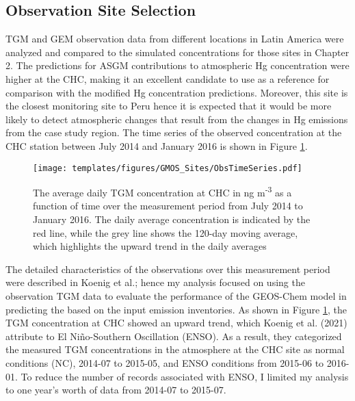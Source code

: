 
\subsection{Observation Site Selection}\label{c3_site_selection}

\begin{flushleft}
TGM and GEM observation data from different locations in Latin America were analyzed and compared to the \gc simulated \hg concentrations for those sites in Chapter 2. The \gc predictions for ASGM contributions to atmospheric Hg concentration were higher at the CHC, making it an excellent candidate to use as a reference for comparison with the modified \gc Hg concentration predictions. Moreover, this site is the closest monitoring site to Peru hence it is expected that it would be more likely to detect atmospheric \hg changes that result from the changes in Hg emissions from the case study region. The time series of the observed concentration at the CHC station between July 2014 and January 2016 is shown in Figure \ref{fig:chc_time_series}.
\end{flushleft}

\begin{figure}[H]
  \texttt{[image: templates/figures/GMOS\_Sites/ObsTimeSeries.pdf]}
 
  \caption[The average daily TGM concentration at CHC in ng m\textsuperscript{-3} as a function of time over the measurement period from July 2014 to January 2016.]{The average daily TGM concentration at CHC in ng m\textsuperscript{-3} as a function of time over the measurement period from July 2014 to January 2016\cite{koenig_seasonal_2021}. The daily average concentration is indicated by the red line, while the grey line shows the 120-day moving average, which highlights the upward trend in the daily averages}
  \label{fig:chc_time_series}
  \centering
\end{figure}
\FloatBarrier
\begin{flushleft}

The detailed characteristics of the observations over this measurement period were described in Koenig et al.\cite{koenig_seasonal_2021}; hence my analysis focused on using the observation TGM data to evaluate the performance of the GEOS-Chem model in predicting the \hg based on the input \hg emission inventories. As shown in Figure \ref{fig:chc_time_series}, the TGM concentration at CHC showed an upward trend, which Koenig et al. (2021) attribute to El Ni\~no-Southern Oscillation (ENSO)\cite{koenig_seasonal_2021}. As a result, they categorized the measured TGM concentrations in the atmosphere at the CHC site as normal conditions (NC), 2014-07 to 2015-05, and ENSO conditions from 2015-06 to 2016-01. To reduce the number of records associated with ENSO, I limited my analysis to one year's worth of data from 2014-07 to 2015-07.
\end{flushleft}

